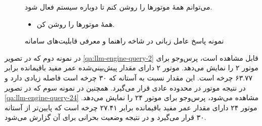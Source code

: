 \begin{figure}[h]
\begin{minipage}{0.92\textwidth}
\begin{botBox}
			می‌توانم همهٔ موتورها را روشن کنم تا دوباره سیستم فعال شود.
			
			\exLabel
			\begin{itemize}[rightmargin=1.5em, topsep=2pt, itemsep=1pt]
				\item همهٔ موتورها را روشن کن.
			\end{itemize}
			
		\end{botBox}
		
	\end{minipage}
	\caption{نمونه پاسخ عامل زبانی در شاخه راهنما و معرفی قابلیت‌های سامانه}
	\label{qa:llm-help}
\end{figure}


در نمونه دوم که در تصویر 
\ref{qa:llm-engine-query-2}
قابل مشاهده است، پرس‌وجو برای موتور ۲ را نمایش می‌دهد. موتور ۲ دارای مقدار پیش‌بینی‌شده عمر مفید باقیمانده برابر ۶۳.۷۷ چرخه است. این مقدار نسبت به آستانه که ۳۰ چرخه است فاصله زیادی دارد و در نتیجه موتور در محدوده عادی قرار می‌گیرد. 
همچنین در نمونه سوم که در تصویر
\ref{qa:llm-engine-query-24}
مشاهده می‌شود، پرس‌وجو برای موتور ۲۴ را نمایش می‌دهد. موتور ۲۴ دارای مقدار عمر مفید باقیمانده برابر ۲۷.۴۱ چرخه است که پایین‌تر از آستانه ۳۰ قرار می‌گیرد و در نتیجه وضعیت بحرانی برای آن گزارش می‌شود.
\





